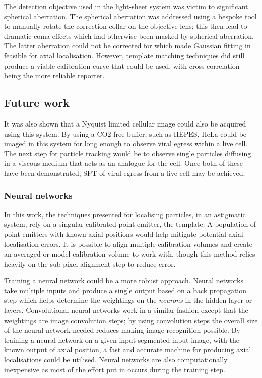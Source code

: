 The detection objective used in the light-sheet system was victim to significant spherical aberration.
The spherical aberration was addressed using a bespoke tool to manually rotate the correction collar on the objective lens; this then lead to dramatic coma effects which had otherwise been masked by spherical aberration.
The latter aberration could not be corrected for which made Gaussian fitting in feasible for axial localisation.
However, template matching techniques did still produce a viable calibration curve that could be used, with cross-correlation being the more reliable reporter.


\subsection{Future work}

It was also shown that a Nyquist limited cellular image could also be acquired using this system.
By using a CO2 free buffer, such as HEPES, HeLa could be imaged in this system for long enough to observe viral egress within a live cell.
The next step for particle tracking would be to observe single particles diffusing in a viscous medium that acts as an analogue for the cell.
Once both of these have been demonstrated, SPT of viral egress from a live cell may be achieved.

\subsubsection{Neural networks} %

In this work, the techniques presented for localising particles, in an astigmatic system, rely on a singular calibrated point emitter, the template.
A population of point-emitters with known axial positions would help mitigate potential axial localisation errors.
It is possible to align multiple calibration volumes and create an averaged or model calibration volume to work with, though this method relies heavily on the sub-pixel alignment step to reduce error.

Training a neural network could be a more robust approach.
Neural networks take multiple inputs and produce a single output based on a back propagation step which helps determine the weightings on the \emph{neurons} in the hidden layer or layers.
Convolutional neural networks work in a similar fashion except that the weightings are image convolution steps; by using convolution steps the overall size of the neural network needed reduces making image recognition possible.
By training a neural network on a given input segmented input image, with the known output of axial position, a fast and accurate machine for producing axial localisations could be utilised.
Neural networks are also computationally inexpensive as most of the effort put in occurs during the training step.

